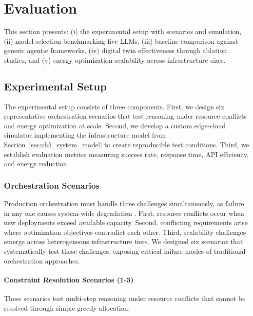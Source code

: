 \section{Evaluation}
\label{sec:ch5_eval}

This section presents: (i) the experimental setup with scenarios and simulation, (ii) model selection benchmarking five \acp{LLM}, (iii) baseline comparison against generic agentic frameworks, (iv) digital twin effectiveness through ablation studies, and (v) energy optimization scalability across infrastructure sizes. 

\subsection{Experimental Setup}
\label{subsec:ch5_setup}

The experimental setup consists of three components. First, we design six representative orchestration scenarios that test reasoning under resource conflicts and energy optimization at scale. Second, we develop a custom edge-cloud simulator implementing the infrastructure model from Section~\ref{sec:ch5_system_model} to create reproducible test conditions. Third, we establish evaluation metrics measuring success rate, response time, \ac{API} efficiency, and energy reduction.


\subsubsection{Orchestration Scenarios}

Production orchestration must handle three challenges simultaneously, as failure in any one causes system-wide degradation \cite{6g_struggles_orchestration2025}. First, resource conflicts occur when new deployments exceed available capacity. Second, conflicting requirements arise where optimization objectives contradict each other. Third, scalability challenges emerge across heterogeneous infrastructure tiers. We designed six scenarios that systematically test these challenges, exposing critical failure modes of traditional orchestration approaches.

\paragraph{Constraint Resolution Scenarios (1-3)}
These scenarios test multi-step reasoning under resource conflicts that cannot be resolved through simple greedy allocation.

